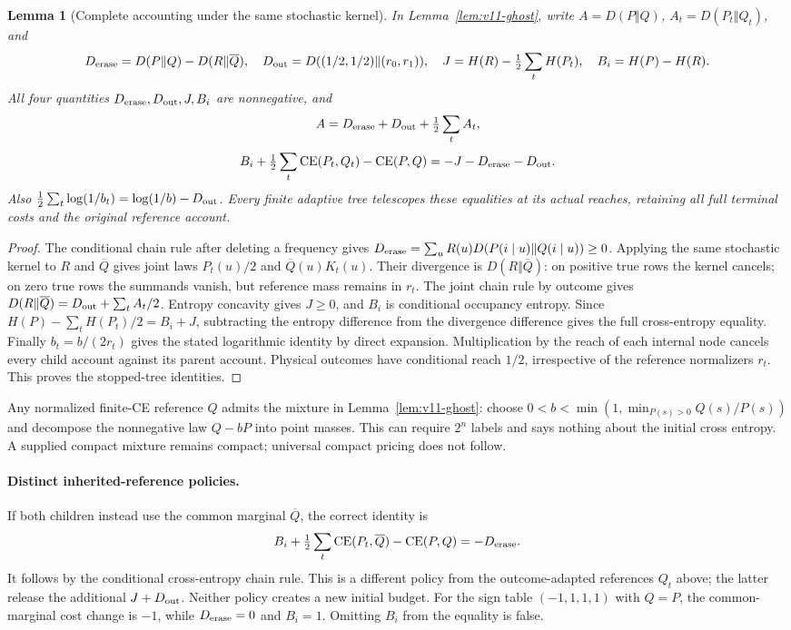 \documentclass[11pt]{article}
\newtheorem{lemma}{Lemma}
\begin{document}
\begin{lemma}[Complete accounting under the same stochastic kernel]
\label{lem:v11-account}
In Lemma~\ref{lem:v11-ghost}, write $A=D(P\Vert Q)$,
$A_t=D(P_t\Vert Q_t)$, and
\[
 D_{\rm erase}=D(P\Vert Q)-D(R\Vert\overline Q),\quad
 D_{\rm out}=D((1/2,1/2)\Vert(r_0,r_1)),\quad
 J=H(R)-\tfrac12\sum_tH(P_t),\quad B_i=H(P)-H(R).
\]
All four quantities $D_{\rm erase},D_{\rm out},J,B_i$ are nonnegative, and
\[
 A=D_{\rm erase}+D_{\rm out}+\tfrac12\sum_t A_t,
\]
\[
 B_i+\tfrac12\sum_t\operatorname{CE}(P_t,Q_t)-\operatorname{CE}(P,Q)
 =-J-D_{\rm erase}-D_{\rm out}.
\]
Also $\tfrac12\sum_t\log(1/b_t)=\log(1/b)-D_{\rm out}$.
Every finite adaptive tree telescopes these equalities at its actual reaches, retaining
all full terminal costs and the original reference account.
\end{lemma}
\begin{proof}
The conditional chain rule after deleting a frequency gives
$D_{\rm erase}=\sum_uR(u)D(P(i\mid u)\Vert Q(i\mid u))\geq0$.
Applying the same stochastic kernel to $R$ and $\overline Q$ gives joint laws
$P_t(u)/2$ and $\overline Q(u)K_t(u)$. Their divergence is $D(R\Vert\overline Q)$:
on positive true rows the kernel cancels; on zero true rows the summands vanish,
but reference mass remains in $r_t$. The joint chain rule by outcome gives
$D(R\Vert\overline Q)=D_{\rm out}+\sum_t A_t/2$.
Entropy concavity gives $J\geq0$, and $B_i$ is conditional occupancy entropy.
Since $H(P)-\sum_tH(P_t)/2=B_i+J$, subtracting the entropy difference from the
divergence difference gives the full cross-entropy equality. Finally
$b_t=b/(2r_t)$ gives the stated logarithmic identity by direct expansion.
Multiplication by the reach of each internal node cancels every child account against
its parent account. Physical outcomes have conditional reach $1/2$, irrespective of
the reference normalizers $r_t$. This proves the stopped-tree identities.
\end{proof}

Any normalized finite-CE reference $Q$ admits the mixture in
Lemma~\ref{lem:v11-ghost}: choose
$0<b<\min(1,\min_{P(s)>0}Q(s)/P(s))$ and decompose the nonnegative law $Q-bP$
into point masses. This can require $2^n$ labels and says nothing about the initial
cross entropy. A supplied compact mixture remains compact; universal compact pricing
does not follow.

\paragraph{Distinct inherited-reference policies.}
If both children instead use the common marginal $\overline Q$, the correct identity is
\[
 B_i+\tfrac12\sum_t\operatorname{CE}(P_t,\overline Q)
 -\operatorname{CE}(P,Q)=-D_{\rm erase}.
\]
It follows by the conditional cross-entropy chain rule. This is a different policy
from the outcome-adapted references $Q_t$ above; the latter release the additional
$J+D_{\rm out}$. Neither policy creates a new initial budget. For the sign table
$(-1,1,1,1)$ with $Q=P$, the common-marginal cost change is $-1$, while
$D_{\rm erase}=0$ and $B_i=1$. Omitting $B_i$ from the equality is false.
\end{document}
